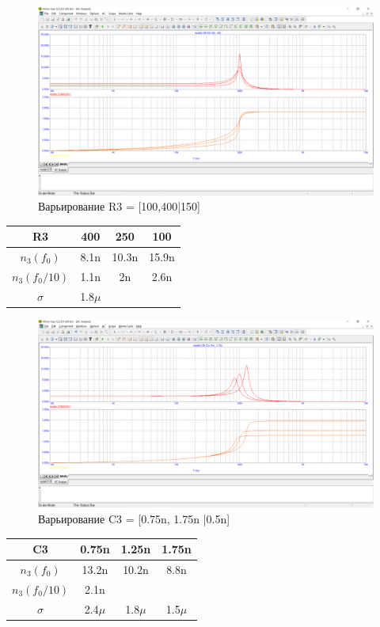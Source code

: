 \documentclass[a4paper, 12pt]{article}%
\begin{document}
\begin{figure}[h!]
    \centering
    \includegraphics[scale = 0.4 \textwidth]{images/mod3_3_2_1.png}
    \caption{Варьирование R3 = [100,400|150]}
    \label{fig:m3321}
\end{figure}

\begin{tabular}{|c|c|c|c|}
    R3 & 400 & 250 & 100\\ \hline
    $n_3(f_0)$ & 8.1n & 10.3n & 15.9n\\ \hline
    $n_3(f_0/10)$ & 1.1n & 2n & 2.6n\\ \hline
    $\sigma$ & 1.8$\mu$ & &\\ \hline
\end{tabular}

\begin{figure}[h!]
    \centering
    \includegraphics[scale = 0.4 \textwidth]{images/mod3_3_2_2.png}
    \caption{Варьирование C3 = [0.75n, 1.75n |0.5n]}
    \label{fig:m3322}
\end{figure}

\begin{tabular}{|c|c|c|c|}
    C3 & 0.75n & 1.25n & 1.75n\\ \hline
    $n_3(f_0)$ & 13.2n & 10.2n & 8.8n\\ \hline
    $n_3(f_0/10)$ & 2.1n &  & \\ \hline
    $\sigma$ & 2.4$\mu$ & 1.8$\mu$ & 1.5$\mu$ \\ \hline
\end{tabular}
\end{document}
